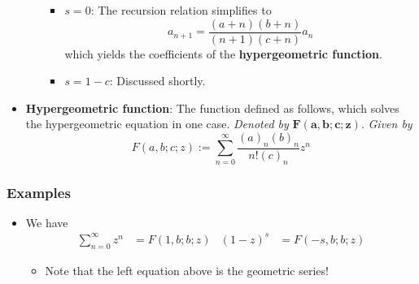 \documentclass[../finalProject.tex]{subfiles}
\begin{document}
\begin{itemize}
\begin{itemize}
\begin{itemize}
            \item \underline{$s=0$}: The recursion relation simplifies to
            \begin{equation*}
                a_{n+1} = \frac{(a+n)(b+n)}{(n+1)(c+n)}a_n
            \end{equation*}
            which yields the coefficients of the \textbf{hypergeometric function}.
            \item \underline{$s=1-c$}: Discussed shortly.
        \end{itemize}
    \end{itemize}
    \item \textbf{Hypergeometric function}: The function defined as follows, which solves the hypergeometric equation in one case. \emph{Denoted by} $\bm{F(a,b;c;z)}$. \emph{Given by}
    \begin{equation*}
        F(a,b;c;z) := \sum_{n=0}^\infty\frac{(a)_n(b)_n}{n!(c)_n}z^n
    \end{equation*}
\end{itemize}

\subsubsection{Examples}
\begin{itemize}
    \item We have
    \begin{align*}
        \sum_{n=0}^\infty z^n &= F(1,b;b;z)&
        (1-z)^s &= F(-s,b;b;z)
    \end{align*}
    \begin{itemize}
        \item Note that the left equation above is the geometric series!
    \end{itemize}
\end{itemize}
\end{document}

